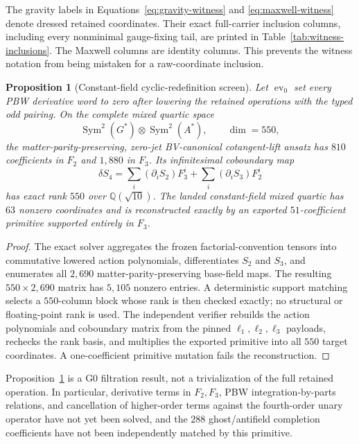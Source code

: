 \documentclass[11pt]{article}
\newtheorem{proposition}[theorem]{Proposition}
\theoremstyle{definition}
\theoremstyle{remark}
\newcommand{\Q}{\mathbb Q}
\begin{document}
The gravity labels in Equations~\eqref{eq:gravity-witness} and
\eqref{eq:maxwell-witness} denote dressed retained coordinates.  Their exact
full-carrier inclusion columns, including every nonminimal gauge-fixing tail,
are printed in Table~\ref{tab:witness-inclusions}.  The Maxwell columns are
identity columns.  This prevents the witness notation from being mistaken for
a raw-coordinate inclusion.

\begin{proposition}[Constant-field cyclic-redefinition screen]
\label{prop:constant-redefinition}
Let $\operatorname{ev}_0$ set every PBW derivative word to zero after lowering
the retained operations with the typed odd pairing.  On the complete mixed
quartic space
\begin{equation}
 \operatorname{Sym}^2(G^*)\otimes\operatorname{Sym}^2(A^*),
 \qquad \dim=550,
\end{equation}
the matter-parity-preserving, zero-jet BV-canonical cotangent-lift ansatz has
$810$ coefficients in $F_2$ and $1{,}880$ in $F_3$.  Its infinitesimal
coboundary map
\begin{equation}\label{eq:constant-redefinition}
 \delta S_4
 =\sum_i (\partial_iS_2)F_3^i
  +\sum_i (\partial_iS_3)F_2^i
\end{equation}
has exact rank $550$ over $\Q(\sqrt{10})$.  The landed constant-field mixed
quartic has $63$ nonzero coordinates and is reconstructed exactly by an
exported $51$-coefficient primitive supported entirely in $F_3$.
\end{proposition}

\begin{proof}
The exact solver aggregates the frozen factorial-convention tensors into
commutative lowered action polynomials, differentiates $S_2$ and $S_3$, and
enumerates all $2{,}690$ matter-parity-preserving base-field maps.  The
resulting $550\times2{,}690$ matrix has $5{,}105$ nonzero entries.  A
deterministic support matching selects a $550$-column block whose rank is
then checked exactly; no structural or floating-point rank is used.  The
independent verifier rebuilds the action polynomials and coboundary matrix
from the pinned $\ell_1,\ell_2,\ell_3$ payloads, rechecks the rank basis, and
multiplies the exported primitive into all $550$ target coordinates.  A
one-coefficient primitive mutation fails the reconstruction.
\end{proof}

Proposition~\ref{prop:constant-redefinition} is a G0 filtration result, not a
trivialization of the full retained operation.  In particular, derivative
terms in $F_2,F_3$, PBW integration-by-parts relations, and cancellation of
higher-order terms against the fourth-order unary operator have not yet been
solved, and the $288$ ghost/antifield completion coefficients have not been
independently matched by this primitive.
\end{document}
